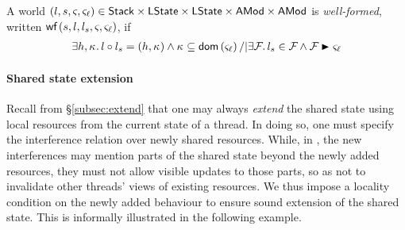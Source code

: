 


\begin{definition}
A world $(l, s, \varsigma_{}, \varsigma_{\ell}) \in
\mathsf{Stack}\times\textsf{LState}\times\textsf{LState}\times\textsf{AMod}\times\textsf{AMod}$ is
\emph{well-formed}, written $\textsf{wf}\left( s, l, l_s, \varsigma_{}, \varsigma_{\ell} \right)$, if
\begin{align*}
  \exsts{h,\ca{}}
  l \composeL l_s = (h,\ca{}) \land \ca{}\subseteq \dom{\amod{\ell}}
  /|
  \exsts{\fence{}} 
  l_s \in \fence{} \land 
  \fence{} \strictfences \amod{\ell}
\end{align*}
\end{definition}









\paragraph{Shared state extension}
Recall from \S\ref{subsec:extend} that one may always \emph{extend}
the shared state using local resources from the current state of a
thread. In doing so, one must specify the interference relation over
newly shared resources. While, in \colosl, the new interferences may
mention parts of the shared state beyond the newly added resources,
they must not allow visible updates to those parts, so as not to
invalidate other threads' views of existing resources. We thus impose
a locality condition on the newly added behaviour to ensure sound
extension of the shared state. This is informally illustrated in the
following example.

